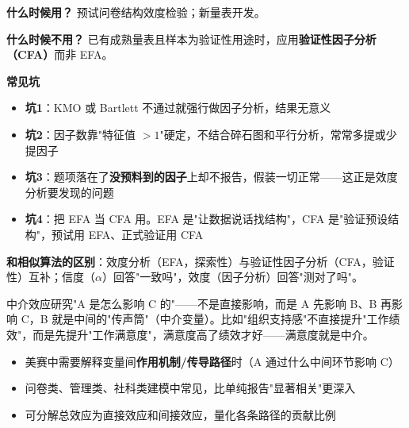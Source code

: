 \begin{algonotes}
\textbf{什么时候用？} 预试问卷结构效度检验；新量表开发。

\textbf{什么时候不用？} 已有成熟量表且样本为验证性用途时，应用\textbf{验证性因子分析（CFA）}而非 EFA。

\textbf{常见坑}
\begin{itemize}
    \item \textbf{坑1}：KMO 或 Bartlett 不通过就强行做因子分析，结果无意义
    \item \textbf{坑2}：因子数靠"特征值 $>1$"硬定，不结合碎石图和平行分析，常常多提或少提因子
    \item \textbf{坑3}：题项落在了\textbf{没预料到的因子}上却不报告，假装一切正常——这正是效度分析要发现的问题
    \item \textbf{坑4}：把 EFA 当 CFA 用。EFA 是"让数据说话找结构"，CFA 是"验证预设结构"，预试用 EFA、正式验证用 CFA
\end{itemize}

\textbf{和相似算法的区别}：效度分析（EFA，探索性）与验证性因子分析（CFA，验证性）互补；信度（$\alpha$）回答"一致吗"，效度（因子分析）回答"测对了吗"。
\end{algonotes}


\begin{algointro}
中介效应研究"A 是怎么影响 C 的"——不是直接影响，而是 A 先影响 B、B 再影响 C，B 就是中间的"传声筒"（中介变量）。比如"组织支持感"不直接提升"工作绩效"，而是先提升"工作满意度"，满意度高了绩效才好——满意度就是中介。
\end{algointro}

\begin{algoscene}
\begin{itemize}
    \item 美赛中需要解释变量间\textbf{作用机制/传导路径}时（A 通过什么中间环节影响 C）
    \item 问卷类、管理类、社科类建模中常见，比单纯报告"显著相关"更深入
    \item 可分解总效应为直接效应和间接效应，量化各条路径的贡献比例
\end{itemize}
\end{algoscene}


